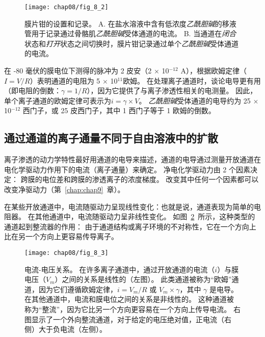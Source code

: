 \begin{figure}[htbp]
	\centering
	\texttt{[image: chap08/fig\_8\_2]}
	\caption{膜片钳的设置和记录。
	A. 在盐水溶液中含有低浓度\textit{乙酰胆碱}的移液管用于记录通过骨骼肌\textit{乙酰胆碱}受体通道的电流\cite{alberts2017molecular}。
	B. 当通道在\textit{闭合}状态和\textit{打开}状态之间切换时，膜片钳记录通过单个\textit{乙酰胆碱}受体通道的电流。}
	\label{fig:8_2}
\end{figure}



在 -80 毫伏的膜电位下测得的脉冲为 2 皮安（2 $\times$ 10$^{-12}$ A），根据欧姆定律（$I = V/R$）表明通道的电阻为 5 $\times$ 10$^{11}$欧姆。
在处理离子通道时，谈论电导更有用（即电阻的倒数：$\gamma = 1/R$），因为它提供了与离子渗透性相关的电测量。
因此，单个离子通道的欧姆定律可表示为$i=\gamma \times V$。
\textit{乙酰胆碱}受体通道的电导约为 25 $\times$ 10$^{-12}$ 西门子，或 25 皮西门子，其中 1 西门子等于 1 欧姆的倒数。



\subsection{通过通道的离子通量不同于自由溶液中的扩散}

离子渗透的动力学特性最好用通道的电导来描述，通道的电导通过测量开放通道在电化学驱动力作用下的电流（离子通量）来确定。
净电化学驱动力由 2 个因素决定：
跨膜的电位差和跨膜的渗透离子的浓度梯度。
改变其中任何一个因素都可以改变净驱动力（第~\ref{chap:chap9}~章）。


在某些开放通道中，电流随驱动力呈现线性变化：也就是说，通道表现为简单的电阻器。
在其他通道中，电流随驱动力呈非线性变化。
如图~\ref{fig:8_3}~所示，这种类型的通道起到整流器的作用：
由于通道结构或离子环境的不对称性，它在一个方向上比在另一个方向上更容易传导离子。


\begin{figure}[htbp]
	\centering
	\texttt{[image: chap08/fig\_8\_3]}
	\caption{电流-电压关系。
		在许多离子通道中，通过开放通道的电流（$i$）与膜电压（$V_m$）之间的关系是线性的（左图）。
		此类通道被称为“欧姆”通道，因为它们遵循欧姆定律，$i = V_m /R$ 或 $ V_m \times \gamma $，其中 $\gamma$ 是电导。
		在其他通道中，电流和膜电位之间的关系是非线性的。
		这种通道被称为“整流”，因为它比另一个方向更容易在一个方向上传导电流。
		右图显示了一个外向整流通道，对于给定的电压绝对值，正电流（右侧）大于负电流（左侧）。}
	\label{fig:8_3}
\end{figure}


